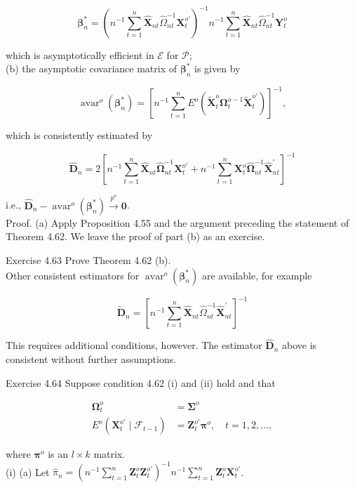 \documentclass[10pt]{article}
\begin{document}
$$
\boldsymbol{\beta}_{n}^{*}=\left(n^{-1} \sum_{t=1}^{n} \hat{\mathbf{X}}_{n t} \hat{\Omega}_{n t}^{-1} \mathbf{X}_{t}^{o \prime}\right)^{-1} n^{-1} \sum_{t=1}^{n} \hat{\mathbf{X}}_{n t} \hat{\Omega}_{n t}^{-1} \mathbf{Y}_{t}^{o}
$$

which is asymptotically efficient in $\mathcal{E}$ for $\mathcal{P}$;\\
(b) the asymptotic covariance matrix of $\boldsymbol{\beta}_{n}^{*}$ is given by

$$
\operatorname{avar}^{o}\left(\boldsymbol{\beta}_{n}^{*}\right)=\left[n^{-1} \sum_{t=1}^{n} E^{o}\left(\tilde{\mathbf{X}}_{t}^{o} \boldsymbol{\Omega}_{t}^{o-1} \tilde{\mathbf{X}}_{t}^{o \prime}\right)\right]^{-1},
$$

which is consistently estimated by

$$
\hat{\mathbf{D}}_{n}=2\left[n^{-1} \sum_{t=1}^{n} \hat{\mathbf{X}}_{n t} \hat{\mathbf{\Omega}}_{n t}^{-1} \mathbf{X}_{t}^{o \prime}+n^{-1} \sum_{t=1}^{n} \mathbf{X}_{t}^{o} \hat{\mathbf{\Omega}}_{n t}^{-1} \hat{\mathbf{X}}_{n t}^{\prime}\right]^{-1}
$$

i.e., $\hat{\mathbf{D}}_{n}-\operatorname{avar}^{o}\left(\boldsymbol{\beta}_{n}^{*}\right) \xrightarrow{p^{o}} \mathbf{0}$.\\
Proof. (a) Apply Proposition 4.55 and the argument preceding the statement of Theorem 4.62. We leave the proof of part (b) as an exercise.

Exercise 4.63 Prove Theorem 4.62 (b).\\
Other consistent estimators for $\operatorname{avar}^{o}\left(\boldsymbol{\beta}_{n}^{*}\right)$ are available, for example

$$
\tilde{\mathbf{D}}_{n}=\left[n^{-1} \sum_{t=1}^{n} \hat{\mathbf{X}}_{n t} \hat{\Omega}_{n t}^{-1} \hat{\mathbf{X}}_{n t}^{\prime}\right]^{-1}
$$

This requires additional conditions, however. The estimator $\hat{\mathbf{D}}_{n}$ above is consistent without further assumptions.

Exercise 4.64 Suppose condition 4.62 (i) and (ii) hold and that

$$
\begin{aligned}
\boldsymbol{\Omega}_{t}^{o} & =\boldsymbol{\Sigma}^{o} \\
E^{o}\left(\mathbf{X}_{t}^{o \prime} \mid \mathcal{F}_{t-1}\right) & =\mathbf{Z}_{t}^{o \prime} \boldsymbol{\pi}^{o}, \quad t=1,2, \ldots,
\end{aligned}
$$

where $\boldsymbol{\pi}^{o}$ is an $l \times k$ matrix.\\
(i) (a) Let $\hat{\pi}_{n}=\left(n^{-1} \sum_{t=1}^{n} \mathbf{Z}_{t}^{o} \mathbf{Z}_{t}^{o \prime}\right)^{-1} n^{-1} \sum_{t=1}^{n} \mathbf{Z}_{t}^{o} \mathbf{X}_{t}^{o \prime}$.
\end{document}
